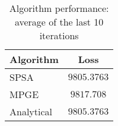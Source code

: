 \begin{table}[H]
    \centering
    \begin{tabular}{lc}
    \toprule
    \textbf{Algorithm} & \textbf{Loss} \\
    \midrule
    SPSA & $9805.3763$ \\
MPGE & $9817.708$ \\
Analytical & $9805.3763$ \\
\bottomrule
    \end{tabular}
    \caption{Algorithm performance: average of the last 10 iterations}
    \end{table}